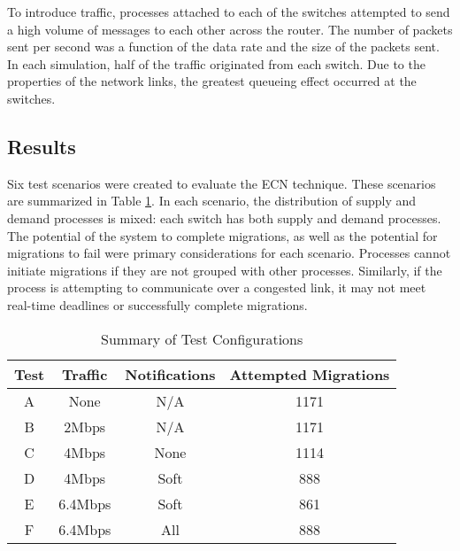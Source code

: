To introduce traffic, processes attached to each of the switches attempted to send a high volume of messages to each other across the router.
The number of packets sent per second was a function of the data rate and the size of the packets sent.
In each simulation, half of the traffic originated from each switch.
Due to the properties of the network links, the greatest queueing effect occurred at the switches.

\subsection{Results}
\label{sect:results}
Six test scenarios were created to evaluate the \ac{ECN} technique.
These scenarios are summarized in Table \ref{tab:scenarios}.
In each scenario, the distribution of supply and demand processes is mixed: each switch has both supply and demand processes.
The potential of the system to complete migrations, as well as the potential for migrations to fail were primary considerations for each scenario.
Processes cannot initiate migrations if they are not grouped with other processes.
Similarly, if the process is attempting to communicate over a congested link, it may not meet real-time deadlines or successfully complete migrations.

\begin{table}
\centering
\caption{Summary of Test Configurations}
\begin{tabular}{| c | c | c | c |}
    \hline
    Test & Traffic & Notifications & Attempted Migrations \\ \hline
    A & None & N/A & 1171 \\ \hline
    B & 2Mbps & N/A & 1171 \\ \hline
    C & 4Mbps & None & 1114  \\ \hline
    D & 4Mbps & Soft & 888 \\ \hline
    E & 6.4Mbps & Soft & 861 \\ \hline
    F & 6.4Mbps & All & 888 \\ \hline
\end{tabular}
\label{tab:scenarios}
\end{table}

